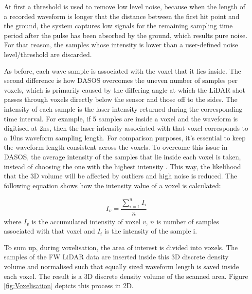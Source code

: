 \documentclass{subfiles}
\begin{document}
	\par At first a threshold is used to remove low level noise, because when the length of a recorded waveform is longer that the distance between the first hit point and the ground, the system captures low signals for the remaining sampling time period after the pulse has been absorbed by the ground, which results pure noise. For that reason, the samples whose intensity is lower than a user-defined noise level/threshold are discarded. 
		

		\par As before, each wave sample is associated with the voxel that it lies inside.  {\color{Fuchsia}The second difference is how DASOS overcomes the uneven number of samples per voxels, which is primarily caused by the differing angle at which the LiDAR shot passes through voxels directly below the sensor and those off to the sides. } The intensity of each sample is the laser intensity returned during the corresponding time interval. For example, if 5 samples are inside a voxel and the waveform is digitised at 2ns, then the laser intensity associated with that voxel corresponds to a 10ns waveform sampling length. For comparison purposes, it's essential to keep the waveform length consistent across the voxels. To overcome this issue in DASOS, the average intensity of the samples that lie inside each voxel is taken, instead of choosing the one with the highest intensity \cite{Persson2005}. This way, the likelihood that the 3D volume will be affected by outliers and high noise is reduced. The following equation shows how the intensity value of a voxel is calculated:
		
		\begin{eqnarray}
		I_{v} = \dfrac{\sum_{i=1}^{n}I_{i}}{n}
		\end{eqnarray} 
		where 		$I_{v}$ is the accumulated intensity of voxel $v$,
		$n$ is number of samples associated with that voxel and
		$I_{i}$ is the intensity of the sample i.
		
		To sum up, during voxelisation, the area of interest is divided into voxels. The samples of the FW LiDAR data are inserted inside this 3D discrete density volume and normalised such that equally sized waveform length is saved inside each voxel. The result is a 3D discrete density volume of the scanned area. Figure \ref{fig:Voxelisation} depicts this process in 2D.
		
\end{document}
